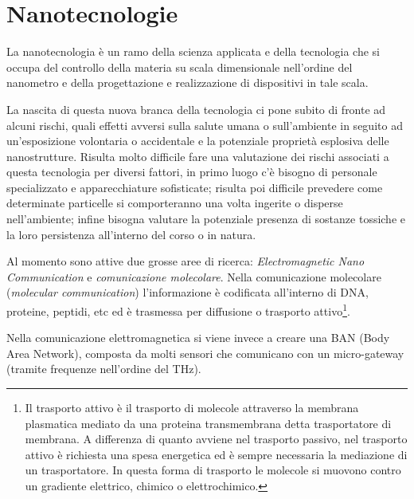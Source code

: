 \section{Nanotecnologie}

	La nanotecnologia è un ramo della scienza applicata e della tecnologia che si occupa del controllo della materia su scala dimensionale nell'ordine del nanometro e della progettazione e realizzazione di dispositivi in tale scala.
	
	La nascita di questa nuova branca della tecnologia ci pone subito di fronte ad alcuni rischi, quali effetti avversi sulla salute umana o sull'ambiente in seguito ad un'esposizione volontaria o accidentale e la potenziale proprietà esplosiva delle nanostrutture.
	Risulta molto difficile fare una valutazione dei rischi associati a questa tecnologia per diversi fattori,
	in primo luogo c'è bisogno di personale specializzato e apparecchiature sofisticate;
	risulta poi difficile prevedere come determinate particelle si comporteranno una volta ingerite o disperse nell'ambiente; infine bisogna valutare la potenziale presenza di sostanze tossiche e la loro persistenza all'interno del corso o in natura.
	
	Al momento sono attive due grosse aree di ricerca: \emph{Electromagnetic Nano Communication} e \emph{comunicazione molecolare}.
	Nella comunicazione molecolare (\emph{molecular communication}) l'informazione è codificata all'interno di DNA, proteine, peptidi, etc ed è trasmessa per diffusione o trasporto attivo\footnote{Il trasporto attivo è il trasporto di molecole attraverso la membrana plasmatica mediato da una proteina transmembrana detta trasportatore di membrana.
		A differenza di quanto avviene nel trasporto passivo, nel trasporto attivo è richiesta una spesa energetica ed è sempre necessaria la mediazione di un trasportatore.
		In questa forma di trasporto le molecole si muovono contro un gradiente elettrico, chimico o elettrochimico.}.
	
	Nella comunicazione elettromagnetica si viene invece a creare una BAN (Body Area Network), composta da molti sensori che comunicano con un micro-gateway (tramite frequenze nell'ordine del THz).